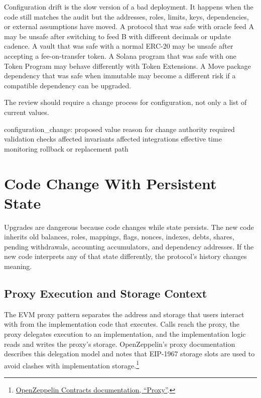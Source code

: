 Configuration drift is the slow version of a bad deployment. It happens when the code still matches the audit but the addresses, roles, limits, keys, dependencies, or external assumptions have moved. A protocol that was safe with oracle feed A may be unsafe after switching to feed B with different decimals or update cadence. A vault that was safe with a normal ERC-20 may be unsafe after accepting a fee-on-transfer token. A Solana program that was safe with one Token Program may behave differently with Token Extensions. A Move package dependency that was safe when immutable may become a different risk if a compatible dependency can be upgraded.

The review should require a change process for configuration, not only a list of current values.

\begin{codeblock}
configuration_change:
    proposed value
    reason for change
    authority required
    validation checks
    affected invariants
    affected integrations
    effective time
    monitoring
    rollback or replacement path
\end{codeblock}

\section{Code Change With Persistent State}

Upgrades are dangerous because code changes while state persists. The new code inherits old balances, roles, mappings, flags, nonces, indexes, debts, shares, pending withdrawals, accounting accumulators, and dependency addresses. If the new code interprets any of that state differently, the protocol's history changes meaning.

\subsection{Proxy Execution and Storage Context}

The EVM proxy pattern separates the address and storage that users interact with from the implementation code that executes. Calls reach the proxy, the proxy delegates execution to an implementation, and the implementation logic reads and writes the proxy's storage. OpenZeppelin's proxy documentation describes this delegation model and notes that EIP-1967 storage slots are used to avoid clashes with implementation storage.\footnote{\href{https://docs.openzeppelin.com/contracts/4.x/api/proxy}{OpenZeppelin Contracts documentation, ``Proxy''}.}

